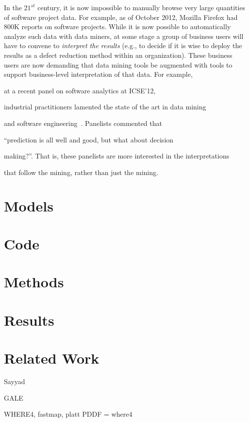 \documentclass[runningheads]{llncs}
\begin{document}
In the $21^{st}$ century, it is now impossible to manually browse very
large quantities of software project data.
For example, as of October 2012,
Mozilla Firefox had 800K reports on software projects.  While it is
now possible to automatically analyze such data with data miners, at
some stage a group of business users will have to convene to {\em
  interpret the results} (e.g., to decide if it is wise to deploy the
results as a defect reduction method within an organization).
These business  users are now demanding that data mining tools
be augmented with tools to support  business-level
interpretation of that data. For example,

at a recent panel on software analytics at ICSE'12,

industrial practitioners lamented the state of the art in data mining

and software engineering~\cite{menzies12a}. Panelists commented that

``prediction is all well and good, but what about decision

making?''. That is, these panelists are more interested in the interpretations

that follow the mining, rather than just  the mining.



\section{Models}


\section{Code}


\section{Methods}

\section{Results}



\section{Related Work}

Sayyad

GALE

WHERE4, fastmap, platt
PDDF = where4
\end{document}
